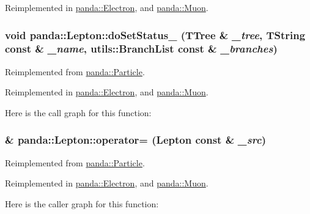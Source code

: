 Reimplemented in \hyperlink{classpanda_1_1Electron_a4da89a6071eab568e7aba8b61d2888a2}{panda::Electron}, and \hyperlink{classpanda_1_1Muon_a7488d95aaa9e9a79bda6d90b8967a52b}{panda::Muon}.\hypertarget{classpanda_1_1Lepton_a2d3b49322244947c933645bbdb44bf88}{
\subsubsection[{doSetStatus\_\-}]{\setlength{\rightskip}{0pt plus 5cm}void panda::Lepton::doSetStatus\_\- (TTree \& {\em \_\-tree}, \/  TString const \& {\em \_\-name}, \/  {\bf utils::BranchList} const \& {\em \_\-branches})}}
\label{classpanda_1_1Lepton_a2d3b49322244947c933645bbdb44bf88}


Reimplemented from \hyperlink{classpanda_1_1Particle_aa30d821beea5e8f3d83580baf162a014}{panda::Particle}.

Reimplemented in \hyperlink{classpanda_1_1Electron_af73c3c5f59267c4bba4ceb0a47cfc6ec}{panda::Electron}, and \hyperlink{classpanda_1_1Muon_a5a1c65b72491bc9df325bc182568e40c}{panda::Muon}.

Here is the call graph for this function:\hypertarget{classpanda_1_1Lepton_a24b1cd552930db2af2734d3acbb27257}{
\subsubsection[{operator=}]{ \& panda::Lepton::operator= ({\bf Lepton} const \& {\em \_\-src})}}
\label{classpanda_1_1Lepton_a24b1cd552930db2af2734d3acbb27257}


Reimplemented from \hyperlink{classpanda_1_1Particle_a8c4fabfceb39b746b0e68a7389e662c4}{panda::Particle}.

Reimplemented in \hyperlink{classpanda_1_1Electron_adf667b212f1ea11094dd276fd913c4f6}{panda::Electron}, and \hyperlink{classpanda_1_1Muon_a2f91424e93572f9efd189884d95efaf6}{panda::Muon}.

Here is the caller graph for this function:

